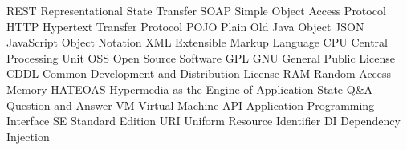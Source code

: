 		{REST}		{Representational State Transfer}
		{SOAP}		{Simple Object Access Protocol}
		{HTTP}		{Hypertext Transfer Protocol}
		{POJO}		{Plain Old Java Object}
		{JSON}		{JavaScript Object Notation}
		{XML}		{Extensible Markup Language}
		{CPU}		{Central Processing Unit}
		{OSS}		{Open Source Software}
		{GPL}		{GNU General Public License}
		{CDDL}		{Common Development and Distribution License}
		{RAM}		{Random Access Memory}
	{HATEOAS}	{Hypermedia as the Engine of Application State}
		{Q\&A}		{Question and Answer}
		{VM}		{Virtual Machine}
		{API}		{Application Programming Interface}
		{SE}		{Standard Edition}
		{URI}		{Uniform Resource Identifier}
		{DI}		{Dependency Injection}